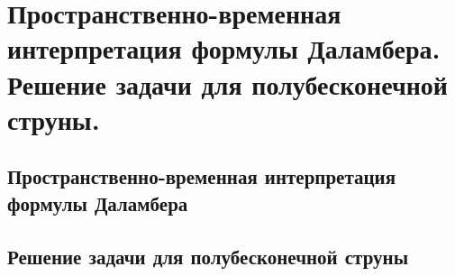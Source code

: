 \chapter{Пространственно-временная интерпретация формулы Даламбера. Решение
задачи для полубесконечной струны.}

\section{Пространственно-временная интерпретация формулы Даламбера}
\section{Решение задачи для полубесконечной струны}
\newpage
